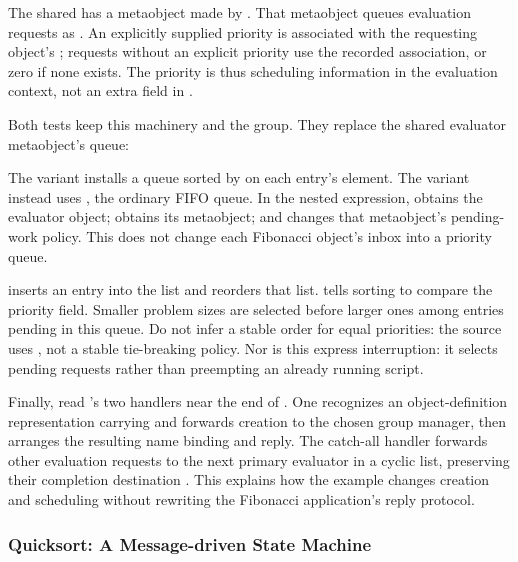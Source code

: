 The shared  has a metaobject made by .
That metaobject queues evaluation requests as
.
An explicitly supplied priority is associated with the requesting
object's ; requests without an explicit priority use the
recorded association, or zero if none exists.
The priority is thus scheduling information in the evaluation context,
not an extra field in .

Both tests keep this machinery and the  group.
They replace the shared evaluator metaobject's queue:


The  variant installs a queue sorted by \code{<} on each
entry's  element. The  variant instead uses
\code{[queue-gen <== :new]}, the ordinary FIFO queue.
In the nested expression, \code{[pcontrol <== :evaluator]} obtains
the evaluator object;  obtains its metaobject; and
 changes that metaobject's pending-work policy.
This does not change each Fibonacci object's inbox into a priority queue.


 inserts an entry into the list and  reorders
that list.  tells sorting to compare the priority
field. Smaller problem sizes are selected before larger ones among
entries pending in this queue. Do not infer a stable order for equal
priorities: the source uses , not a stable tie-breaking
policy. Nor is this express interruption: it selects pending requests
rather than preempting an already running script.

Finally, read 's two handlers near the end of
. One recognizes an object-definition
representation carrying  and forwards creation to
the chosen group manager, then arranges the resulting name binding
and reply. The catch-all handler forwards other evaluation requests
to the next primary evaluator in a cyclic list, preserving their
completion destination . This explains how the example
changes creation and scheduling without rewriting the Fibonacci
application's reply protocol.

\subsubsection{Quicksort: A Message-driven State Machine}
\label{sec:pcontrol-qsort}

